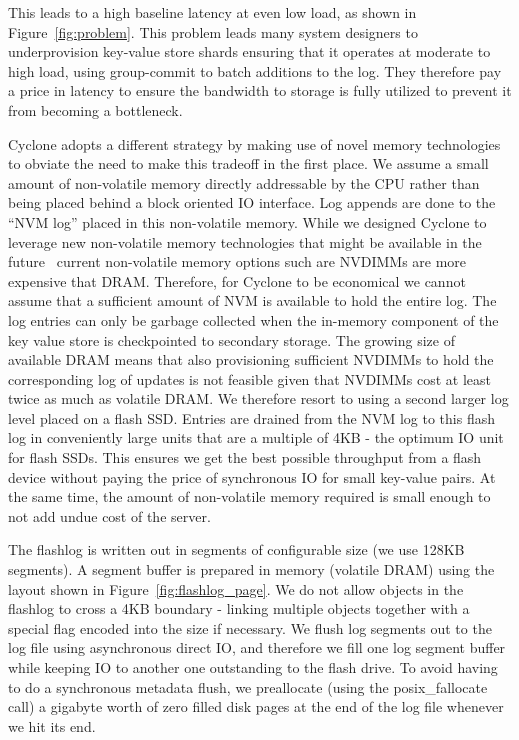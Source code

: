 \documentclass[pageno]{jpaper}
\begin{document}
This leads to a high baseline latency at even low load, as shown in
Figure~\ref{fig:problem}. This problem leads many system designers to
underprovision key-value store shards ensuring that it operates at moderate to
high load, using group-commit to batch additions to the log. They therefore pay
a price in latency to ensure the bandwidth to storage is fully utilized to
prevent it from becoming a bottleneck.

Cyclone adopts a different strategy by making use of novel memory technologies
to obviate the need to make this tradeoff in the first place. We assume a small
amount of non-volatile memory directly addressable by the CPU rather than being placed
behind a block oriented IO interface. Log appends are done to the ``NVM log''
placed in this non-volatile memory. While we designed Cyclone to leverage new
non-volatile memory technologies that might be available in the
future~\cite{3dxpoint} current non-volatile memory options such are NVDIMMs
are more expensive that DRAM. Therefore, for Cyclone to be economical
we cannot assume that a sufficient amount of NVM is available to hold the entire
log. The log entries can only be garbage collected when the in-memory component
of the key value store is checkpointed to secondary storage. The growing size of
available DRAM means that also provisioning sufficient NVDIMMs to hold the
corresponding log of updates is not feasible given that NVDIMMs cost at least
twice as much as volatile DRAM. We therefore resort to using a second larger log
level placed on a flash SSD. Entries are drained from the NVM log to this flash
log in conveniently large units that are a multiple of 4KB - the optimum IO unit
for flash SSDs. This ensures we get the best
possible throughput from a flash device without paying the price of synchronous
IO for small key-value pairs. At the same time, the amount of non-volatile
memory required is small enough to not add undue cost of the server.

The flashlog is written out in segments of configurable size (we use 128KB
segments). A segment buffer is prepared in memory (volatile DRAM) using the
layout shown in Figure~\ref{fig:flashlog_page}. We do not allow objects in the
flashlog to cross a 4KB boundary - linking multiple objects together with a
special flag encoded into the size if necessary. We flush log segments out to
the log file using asynchronous direct IO, and therefore we fill one log segment
buffer while keeping IO to another one outstanding to the flash drive. To avoid
having to do a synchronous metadata flush, we preallocate (using the
posix\_fallocate call) a gigabyte worth of zero filled disk pages at the end of
the log file whenever we hit its end.
\end{document}
